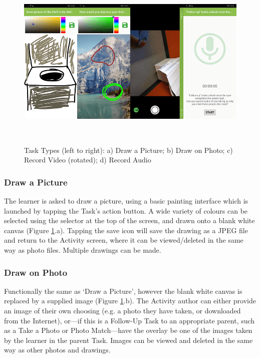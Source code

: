 \begin{figure}
  \centering
  \includegraphics[width=1\columnwidth]{images/chapter05/tasktypes2.png}
  \caption[Task Types (part 2)]{Task Types (left to right): a) Draw a Picture; b) Draw on Photo; c) Record Video (rotated); d) Record Audio}~\label{fig:TaskTypes2}
\end{figure}

\subsubsection*{Draw a Picture}
The learner is asked to draw a picture, using a basic painting interface which is launched by tapping the Task's action button. A wide variety of colours can be selected using the selector at the top of the screen, and drawn onto a blank white canvas (Figure \ref{fig:TaskTypes2}.a). Tapping the save icon will save the drawing as a JPEG file and return to the Activity screen, where it can be viewed/deleted in the same way as photo files. Multiple drawings can be made.

\subsubsection*{Draw on Photo}
Functionally the same as `Draw a Picture', however the blank white canvas is replaced by a supplied image (Figure \ref{fig:TaskTypes2}.b). The Activity author can either provide an image of their own choosing (e.g. a photo they have taken, or downloaded from the Internet), or---if this is a Follow-Up Task to an appropriate parent, such as a Take a Photo or Photo Match---have the overlay be one of the images taken by the learner in the parent Task. Images can be viewed and deleted in the same way as other photos and drawings.

